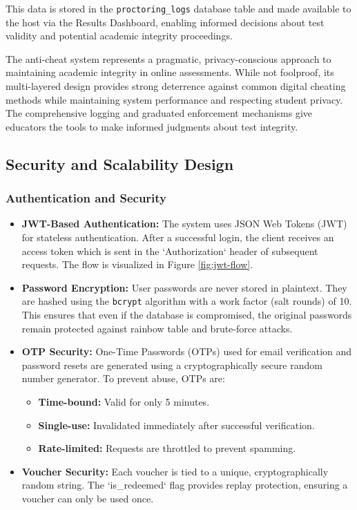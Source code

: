 This data is stored in the \texttt{proctoring\_logs} database table and made available to the host via the Results Dashboard, enabling informed decisions about test validity and potential academic integrity proceedings.

The anti-cheat system represents a pragmatic, privacy-conscious approach to maintaining academic integrity in online assessments. While not foolproof, its multi-layered design provides strong deterrence against common digital cheating methods while maintaining system performance and respecting student privacy. The comprehensive logging and graduated enforcement mechanisms give educators the tools to make informed judgments about test integrity.

\subsection{Security and Scalability Design}

\subsubsection{Authentication and Security}
\begin{itemize}
    \item \textbf{JWT-Based Authentication:} The system uses JSON Web Tokens (JWT) for stateless authentication. After a successful login, the client receives an access token which is sent in the `Authorization` header of subsequent requests. The flow is visualized in Figure \ref{fig:jwt-flow}.
    
    \item \textbf{Password Encryption:} User passwords are never stored in plaintext. They are hashed using the \texttt{bcrypt} algorithm with a work factor (salt rounds) of 10. This ensures that even if the database is compromised, the original passwords remain protected against rainbow table and brute-force attacks.

    \item \textbf{OTP Security:} One-Time Passwords (OTPs) used for email verification and password resets are generated using a cryptographically secure random number generator. To prevent abuse, OTPs are: 
    \begin{itemize}
        \item \textbf{Time-bound:} Valid for only 5 minutes.
        \item \textbf{Single-use:} Invalidated immediately after successful verification.
        \item \textbf{Rate-limited:} Requests are throttled to prevent spamming.
    \end{itemize}

    \item \textbf{Voucher Security:} Each voucher is tied to a unique, cryptographically random string. The `is_redeemed` flag provides replay protection, ensuring a voucher can only be used once.
\end{itemize}

